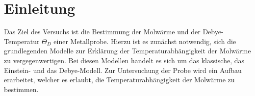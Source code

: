 \section{Einleitung}
Das Ziel des Versuchs ist die Bestimmung der Molwärme und der Debye-Temperatur $\Theta_D$ einer Metallprobe. Hierzu ist es zunächst notwendig, sich die grundlegenden
Modelle zur Erklärung der Temperaturabhängigkeit der Molwärme zu vergegenwertigen. Bei diesen Modellen handelt es sich um das klassische, das Einstein- und das Debye-Modell.
Zur Untersuchung der Probe wird ein Aufbau erarbeitet, welcher es erlaubt, die Temperaturabhängigkeit der Molwärme zu bestimmen.
